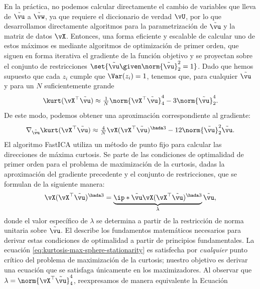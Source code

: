 \documentclass[../../book-main.tex]{subfiles}
\begin{document}
En la práctica, no podemos calcular directamente el cambio de variables que lleva de
$\tilde{\vu}$ a $\tilde{\vw}$, ya que requiere el diccionario de verdad
$\vU$, por lo que desarrollamos directamente algoritmos para la parametrización de $\tilde{\vu}$
y la matriz de datos $\vX$.
Entonces, una forma eficiente y escalable de calcular uno de estos máximos es mediante
algoritmos de optimización de primer orden, que siguen en forma iterativa el
gradiente de la función objetivo y se proyectan sobre el conjunto de restricciones
$\set{\tilde{\vu} \given \norm{\tilde{\vu}}_2^2 = 1}$.
Dado que hemos supuesto que cada $z_i$ cumple que $\Var(z_i)=1$, tenemos
que, para cualquier $\tilde{\vu}$ y para un $N$ suficientemente grande
\begin{equation}\label{eq:kurtosis-approximation-l4}
    \kurt(\vX^\top \tilde{\vu})
    \approx
    \tfrac{1}{N} \norm{\vX^\top \tilde{\vu}}_4^4 - 3 \norm{\tilde{\vu}}_2^4.
\end{equation}
De este modo, podemos obtener una aproximación correspondiente al gradiente:
\begin{equation*}
    \nabla_{\tilde{\vu}} \kurt(\vX^\top \tilde{\vu})
    \approx
    \tfrac{4}{N} \vX (\vX^\top \tilde{\vu})^{\hada 3}
    - 12 \norm{\tilde{\vu}}_2^2 \tilde{\vu}.
\end{equation*}
El algoritmo FastICA utiliza un método de punto fijo para calcular las direcciones
de máxima curtosis. Se parte de las condiciones de optimalidad de primer orden
para el problema de maximización de la curtosis, dadas la aproximación del gradiente precedente
y el conjunto de restricciones, que se formulan de la siguiente manera:
\begin{align}\label{eq:kurtosis-max-sphere-stationarity}
    \vX (\vX^\top \tilde{\vu})^{\hada 3}
    =
    \underbrace{
        \ip*{\tilde{\vu}}{
            \vX (\vX^\top \tilde{\vu})^{\hada 3}
    }}_{\lambda} \tilde{\vu},
\end{align}
donde el valor específico de $\lambda$ se determina a partir de la restricción de norma unitaria 
sobre $\tilde{\vu}$. El  describe los fundamentos matemáticos 
necesarios para derivar estas condiciones de optimalidad a partir de principios fundamentales.
La ecuación \eqref{eq:kurtosis-max-sphere-stationarity} es satisfecha por \textit{cualquier} 
punto crítico del problema de maximización de la curtosis; nuestro objetivo es derivar una 
ecuación que se satisfaga únicamente en los maximizadores.  Al observar que 
$\lambda = \norm{\vX^\top \tilde{\vu}}_4^4$, reexpresamos de manera equivalente la Ecuación 
\end{document}
